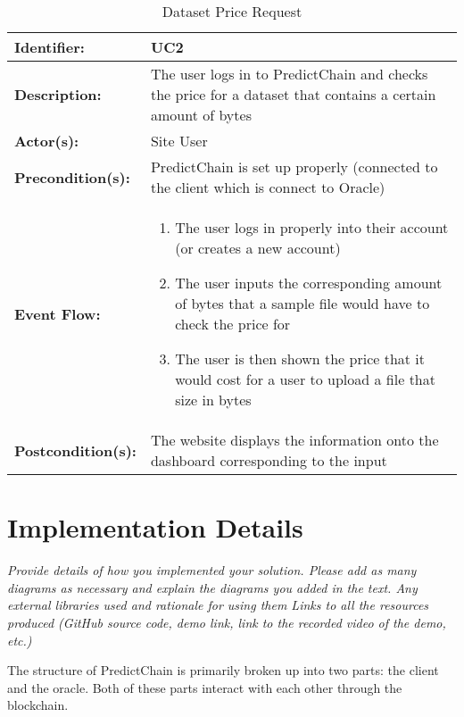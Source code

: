 \documentclass{article}
\begin{document}
\begin{table}[H]
\caption{Dataset Price Request}
\label{tab:my-table}
\centering
\begin{tabular}{|p{3cm}|p{8cm}|}
\hline
\textbf{Identifier:} & UC2 \\
\hline
\textbf{Description:} & The user logs in to PredictChain and checks the price for a dataset that contains a certain amount of bytes\\
\hline
\textbf{Actor(s):} & Site User \\
\hline
\textbf{Precondition(s):} & PredictChain is set up properly (connected to the client which is connect to Oracle) \\
\hline
\textbf{Event Flow:} & 
\begin{enumerate}
    \item The user logs in properly into their account (or creates a new account)
    \item The user inputs the corresponding amount of bytes that a sample file would have to check the price for
    \item The user is then shown the price that it would cost for a user to upload a file that size in bytes
\end{enumerate} \\
\hline
\textbf{Postcondition(s):} & The website displays the information onto the dashboard corresponding to the input \\
\hline
\end{tabular}
\end{table}

\section{Implementation Details}

\emph{Provide details of how you implemented your solution. Please add as many diagrams as necessary and explain the
diagrams you added in the text.
Any external libraries used and rationale for using them
Links to all the resources produced (GitHub source code, demo link, link to the recorded video of the demo, etc.)}

The structure of PredictChain is primarily broken up into two parts: the client and the oracle.  Both of these parts interact
with each other through the blockchain.
\end{document}
